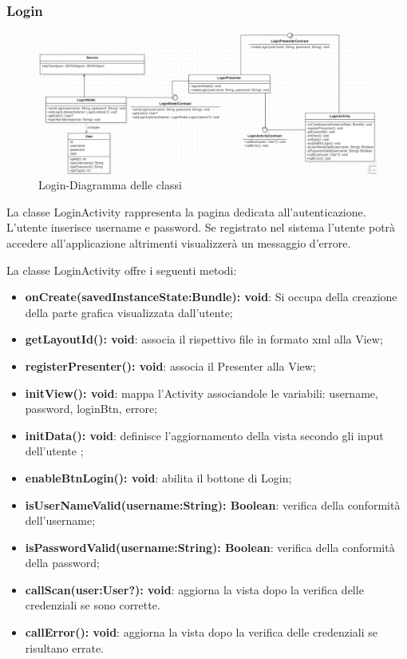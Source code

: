 \subsubsection{Login}
\begin{figure}[H]
	\centering
	\includegraphics[width=16cm]{res/images/loginClass.png}
	\caption{Login-Diagramma delle classi}
	\label{fig:Login-Diagramma delle classi}
\end{figure}
La classe LoginActivity rappresenta la pagina dedicata all'autenticazione. L'utente inserisce username e password. Se registrato nel sistema l'utente potrà accedere all'applicazione altrimenti visualizzerà un messaggio d'errore.

La classe LoginActivity offre i seguenti metodi:
\begin{itemize}
	\item \textbf{onCreate(savedInstanceState:Bundle): void}: Si occupa della creazione della parte grafica visualizzata dall'utente; 
	\item \textbf{getLayoutId(): void}: associa il rispettivo file in formato xml alla View;
	\item \textbf{registerPresenter(): void}: associa il Presenter alla View;
	\item \textbf{initView(): void}: mappa l'Activity associandole le variabili: username, password, loginBtn, errore;
	\item \textbf{initData(): void}: definisce l'aggiornamento della vista secondo gli input dell'utente ;
	\item \textbf{enableBtnLogin(): void}: abilita il bottone di Login;
	\item \textbf{isUserNameValid(username:String): Boolean}: verifica della conformità dell'username;
	\item \textbf{isPasswordValid(username:String): Boolean}: verifica della conformità della password;
	\item \textbf{callScan(user:User?): void}: aggiorna la vista dopo la verifica delle credenziali se sono corrette.
	\item \textbf{callError(): void}: aggiorna la vista dopo la verifica delle credenziali se risultano errate.
\end{itemize}


